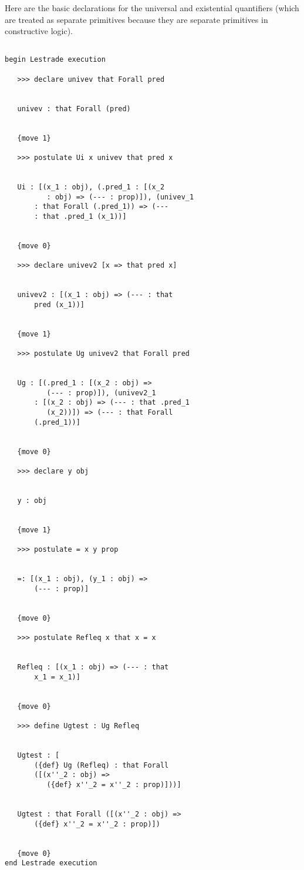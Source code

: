 \documentclass[12pt]{article}
\begin{document}
Here are the basic declarations for the universal and existential quantifiers (which are treated as separate primitives because they are separate
primitives in constructive logic).  

\begin{verbatim}

begin Lestrade execution

   >>> declare univev that Forall pred


   univev : that Forall (pred)


   {move 1}

   >>> postulate Ui x univev that pred x


   Ui : [(x_1 : obj), (.pred_1 : [(x_2 
          : obj) => (--- : prop)]), (univev_1 
       : that Forall (.pred_1)) => (--- 
       : that .pred_1 (x_1))]


   {move 0}

   >>> declare univev2 [x => that pred x]


   univev2 : [(x_1 : obj) => (--- : that 
       pred (x_1))]


   {move 1}

   >>> postulate Ug univev2 that Forall pred


   Ug : [(.pred_1 : [(x_2 : obj) => 
          (--- : prop)]), (univev2_1 
       : [(x_2 : obj) => (--- : that .pred_1 
          (x_2))]) => (--- : that Forall 
       (.pred_1))]


   {move 0}

   >>> declare y obj


   y : obj


   {move 1}

   >>> postulate = x y prop


   =: [(x_1 : obj), (y_1 : obj) => 
       (--- : prop)]


   {move 0}

   >>> postulate Refleq x that x = x


   Refleq : [(x_1 : obj) => (--- : that 
       x_1 = x_1)]


   {move 0}

   >>> define Ugtest : Ug Refleq


   Ugtest : [
       ({def} Ug (Refleq) : that Forall 
       ([(x''_2 : obj) => 
          ({def} x''_2 = x''_2 : prop)]))]


   Ugtest : that Forall ([(x''_2 : obj) => 
       ({def} x''_2 = x''_2 : prop)])


   {move 0}
end Lestrade execution
\end{verbatim}
\end{document}
